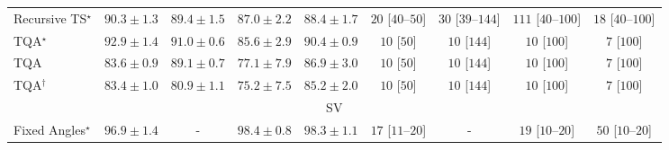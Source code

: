 \begin{tabular}{l|cccc|cccc|}
Recursive TS$^\star$ & {\cellcolor[HTML]{0E743C}} \color[HTML]{F1F1F1} $90.3\pm 1.3$ & {\cellcolor[HTML]{14783E}} \color[HTML]{F1F1F1} $89.4\pm 1.5$ & {\cellcolor[HTML]{228343}} \color[HTML]{F1F1F1} $87.0\pm 2.2$ & {\cellcolor[HTML]{197C40}} \color[HTML]{F1F1F1} $88.4\pm 1.7$ & {\cellcolor[HTML]{FFF3EF}} \color[HTML]{000000} $20$ [$40$--$50$] & {\cellcolor[HTML]{FEF1ED}} \color[HTML]{000000} $30$ [$39$--$144$] & {\cellcolor[HTML]{FDDDD9}} \color[HTML]{000000} $111$ [$40$--$100$] & {\cellcolor[HTML]{FFF3F0}} \color[HTML]{000000} $18$ [$40$--$100$] \\
TQA$^\star$ & {\cellcolor[HTML]{006636}} \color[HTML]{F1F1F1} $92.9\pm 1.4$ & {\cellcolor[HTML]{0A703A}} \color[HTML]{F1F1F1} $91.0\pm 0.6$ & {\cellcolor[HTML]{2A8D49}} \color[HTML]{F1F1F1} $85.6\pm 2.9$ & {\cellcolor[HTML]{0D733C}} \color[HTML]{F1F1F1} $90.4\pm 0.9$ & {\cellcolor[HTML]{FFF6F2}} \color[HTML]{000000} $10$ [$50$] & {\cellcolor[HTML]{FFF6F2}} \color[HTML]{000000} $10$ [$144$] & {\cellcolor[HTML]{FFF6F2}} \color[HTML]{000000} $10$ [$100$] & {\cellcolor[HTML]{FFF6F2}} \color[HTML]{000000} $7$ [$100$] \\
TQA & {\cellcolor[HTML]{349A52}} \color[HTML]{F1F1F1} $83.6\pm 0.9$ & {\cellcolor[HTML]{15793E}} \color[HTML]{F1F1F1} $89.1\pm 0.7$ & {\cellcolor[HTML]{68BE71}} \color[HTML]{000000} $77.1\pm 7.9$ & {\cellcolor[HTML]{228343}} \color[HTML]{F1F1F1} $86.9\pm 3.0$ & {\cellcolor[HTML]{FFF6F2}} \color[HTML]{000000} $10$ [$50$] & {\cellcolor[HTML]{FFF6F2}} \color[HTML]{000000} $10$ [$144$] & {\cellcolor[HTML]{FFF6F2}} \color[HTML]{000000} $10$ [$100$] & {\cellcolor[HTML]{FFF6F2}} \color[HTML]{000000} $7$ [$100$] \\
TQA$^\dagger$ & {\cellcolor[HTML]{359C53}} \color[HTML]{F1F1F1} $83.4\pm 1.0$ & {\cellcolor[HTML]{43AC5E}} \color[HTML]{F1F1F1} $80.9\pm 1.1$ & {\cellcolor[HTML]{7AC77A}} \color[HTML]{000000} $75.2\pm 7.5$ & {\cellcolor[HTML]{2C8F4B}} \color[HTML]{F1F1F1} $85.2\pm 2.0$ & {\cellcolor[HTML]{FFF6F2}} \color[HTML]{000000} $10$ [$50$] & {\cellcolor[HTML]{FFF6F2}} \color[HTML]{000000} $10$ [$144$] & {\cellcolor[HTML]{FFF6F2}} \color[HTML]{000000} $10$ [$100$] & {\cellcolor[HTML]{FFF6F2}} \color[HTML]{000000} $7$ [$100$] \\
\cline{1-9}
\multicolumn{9}{c}{\rule{0pt}{8pt}SV} \\
\midrule
Fixed Angles$^\star$ & {\cellcolor[HTML]{034165}} \color[HTML]{F1F1F1} $96.9\pm 1.4$ & {\cellcolor[HTML]{000000}} \color[HTML]{F1F1F1} {\cellcolor{white}} \color{black} - & {\cellcolor[HTML]{023858}} \color[HTML]{F1F1F1} $98.4\pm 0.8$ & {\cellcolor[HTML]{023858}} \color[HTML]{F1F1F1} $98.3\pm 1.1$ & {\cellcolor[HTML]{FFF3F0}} \color[HTML]{000000} $17$ [$11$--$20$] & {\cellcolor[HTML]{000000}} \color[HTML]{F1F1F1} {\cellcolor{white}} \color{black} - & {\cellcolor[HTML]{FFF3F0}} \color[HTML]{000000} $19$ [$10$--$20$] & {\cellcolor[HTML]{FEEBE8}} \color[HTML]{000000} $50$ [$10$--$20$] \\

\end{tabular}

